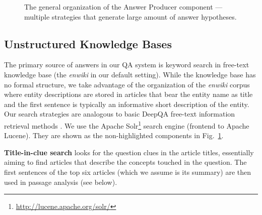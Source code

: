 \begin{figure}[hb]
\begin{center}
\caption{The general organization of the Answer Producer component --- multiple strategies that generate large amount of answer hypotheses.}
\label{fig:arch-ap}
\end{center}
\end{figure}%

\subsection{Unstructured Knowledge Bases}

The primary source of answers in our QA system is keyword search in free-text knowledge base
(the \textit{enwiki} in our default setting).
While the knowledge base has no formal structure,
we take advantage of the organization of the \textit{enwiki} corpus
where entity descriptions are stored in articles that bear the entity name as title
and the first sentence is typically an informative short description of the entity.
Our search strategies are analogous to basic DeepQA free-text information retrieval methods \citep{WatsonIR}.
We use the Apache Solr\footnote{\url{http://lucene.apache.org/solr/}} search engine (frontend to Apache Lucene).
They are shown as the non-highlighted components in Fig.~\ref{fig:arch-ap}.

\textbf{Title-in-clue search} \citep{WatsonIR} looks for the question clues in the article titles,
essentially aiming to find articles that describe the concepts touched in the question.
The first sentences of the top six articles (which we assume is its summary)
are then used in passage analysis (see below).

